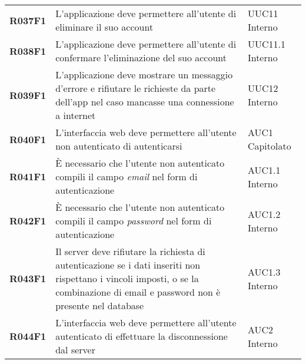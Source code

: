 \documentclass[../analisi-dei-requisiti.tex]{subfiles}
\begin{document}
\begin{center}
\begin{longtable}[H]{>{\centering\bfseries}m{3cm} >{\centering}m{10cm} >{\centering\arraybackslash}m{3cm}}
  R037F1                               & L'applicazione deve permettere all'utente di eliminare il suo account                                                                                                                                   & UUC11 Interno                 \\
  R038F1                               & L'applicazione deve permettere all'utente di confermare l'eliminazione del suo account                                                                                                                  & UUC11.1 Interno               \\
  R039F1                               & L'applicazione deve mostrare un messaggio d'errore e rifiutare le richieste da parte dell'app nel caso mancasse una connessione a internet                                                              & UUC12 Interno                 \\

  R040F1                               & L'interfaccia web deve permettere all'utente non autenticato di autenticarsi                                                                                                                            & AUC1 Capitolato               \\
  R041F1                               & È necessario che l'utente non autenticato compili il campo \textit{email} nel form di autenticazione                                                                                                    & AUC1.1 Interno                \\
  R042F1                               & È necessario che l'utente non autenticato compili il campo \textit{password} nel form di autenticazione                                                                                                 & AUC1.2 Interno                \\
  R043F1                               & Il server deve rifiutare la richiesta di autenticazione se i dati inseriti non rispettano i vincoli imposti, o se la combinazione di email e password non è presente nel database                       & AUC1.3 Interno                \\
  R044F1                               & L'interfaccia web deve permettere all'utente autenticato di effettuare la disconnessione dal server                                                                                                     & AUC2 Interno                  \\


\end{longtable}
\end{center}
\end{document}
